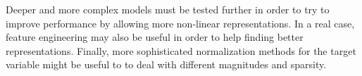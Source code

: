 \documentclass{elsarticle}
\begin{document}
	Deeper and more complex models must be tested further in order to try to improve performance by allowing more non-linear representations. In a real case, feature engineering may also be useful in order to help finding better representations. Finally, more sophisticated normalization methods for the target variable might be useful to to deal with different magnitudes and sparsity.
	
	\newpage
	
	
	
	

	
\end{document}

